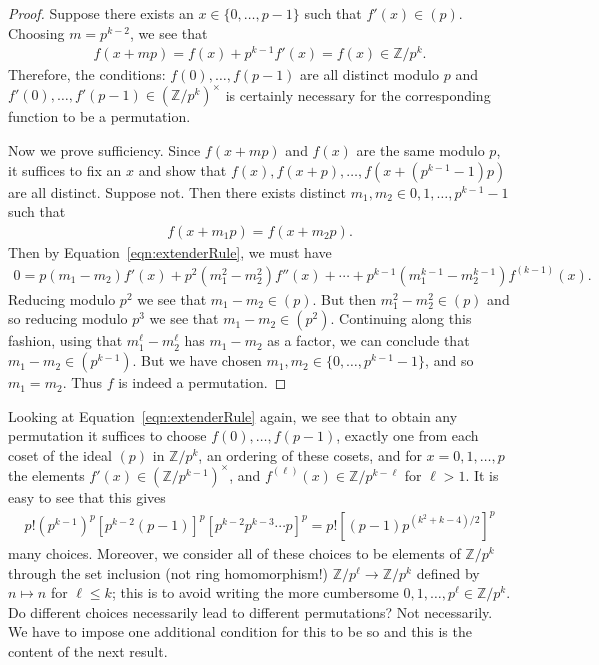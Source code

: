 \documentclass[oneside]{amsart}
\theoremstyle{nthm}
\theoremstyle{ndef}
\theoremstyle{nrem}
\newcommand{\Z}{\mathbb{Z}}
\begin{document}
\begin{proof}
    Suppose there exists an $x\in \{0,\dots,p-1\}$ such that $f'(x) \in (p)$. Choosing $m = p^{k-2}$, we see that
    \begin{align*}
        f(x + mp) = f(x) + p^{k-1}f'(x) = f(x) \in \Z/p^k.
    \end{align*}
    Therefore, the conditions: $f(0),\dots,f(p-1)$ are all distinct modulo $p$ and $f'(0),\dots,f'(p-1)\in (\Z/p^k)^\times$ is certainly necessary for the corresponding function to be a permutation.
    
    Now we prove sufficiency. Since $f(x + mp)$ and $f(x)$ are the same modulo $p$, it suffices to fix an $x$ and show that $f(x), f(x + p), \dots, f(x + (p^{k-1}-1)p)$ are all distinct. Suppose not. Then there exists distinct $m_1,m_2\in 0,1,\dots,p^{k-1} - 1$ such that
    \begin{align*}
        f(x + m_1p) = f(x + m_2p).
    \end{align*}
    Then by Equation~\eqref{eqn:extenderRule}, we must have
    \begin{align*}
        0 = p(m_1 - m_2)f'(x) + p^2(m_1^2 - m_2^2)f''(x) + \cdots + p^{k-1}(m_1^{k-1} - m_2^{k-1})f^{(k-1)}(x).
    \end{align*}
    Reducing modulo $p^2$ we see that $m_1 - m_2\in (p)$. But then $m_1^2 - m_2^2\in (p)$ and so reducing modulo $p^3$ we see that $m_1 - m_2\in (p^2)$. Continuing along this fashion, using that $m_1^\ell - m_2^\ell$ has $m_1 - m_2$ as a factor, we can conclude that $m_1 - m_2\in (p^{k-1})$. But we have chosen $m_1,m_2\in \{0,\dots,p^{k-1}-1\}$, and so $m_1 = m_2$. Thus $f$ is indeed a permutation.
\end{proof}
Looking at Equation~\eqref{eqn:extenderRule} again, we see that to obtain any permutation it suffices to choose $f(0),\dots,f(p-1)$, exactly one from each coset of the ideal $(p)$ in $\Z/p^k$, an ordering of these cosets, and for $x = 0,1,\dots,p$ the elements $f'(x)\in (\Z/p^{k-1})^\times$, and $f^{(\ell)}(x) \in \Z/p^{k-\ell}$ for $\ell > 1$. It is easy to see that this gives
\begin{align*}
    p!(p^{k-1})^p[p^{k-2}(p-1)]^p[p^{k-2}p^{k-3}\cdots p]^p = p![(p-1)p^{(k^2+k-4)/2}]^p
\end{align*}
many choices. Moreover, we consider all of these choices to be elements of $\Z/p^k$ through the set inclusion (not ring homomorphism!) $\Z/p^\ell\to\Z/p^k$  defined by $n\mapsto n$ for $\ell \leq k$; this is to avoid writing the more cumbersome $0,1,\dots,p^\ell\in \Z/p^k$. Do different choices necessarily lead to different permutations? Not necessarily. We have to impose one additional condition for this to be so and this is the content of the next result.
\end{document}
